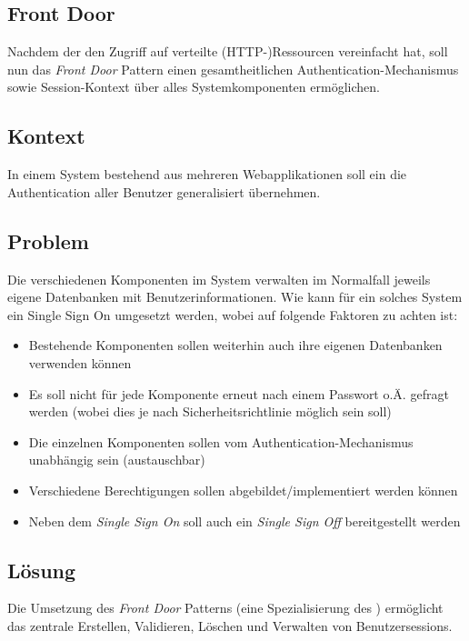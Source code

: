 \subsection{Front Door}

Nachdem der  den Zugriff auf verteilte (HTTP-)Ressourcen vereinfacht hat, soll nun das \emph{Front Door} Pattern einen gesamtheitlichen Authentication-Mechanismus sowie Session-Kontext über alles Systemkomponenten ermöglichen.

\subsection*{Kontext}
In einem System bestehend aus mehreren Webapplikationen soll ein  die Authentication aller Benutzer generalisiert übernehmen.

\subsection*{Problem}
Die verschiedenen Komponenten im System verwalten im Normalfall jeweils eigene Datenbanken mit Benutzerinformationen. Wie kann für ein solches System ein Single Sign On umgesetzt werden, wobei auf folgende Faktoren zu achten ist:

\begin{itemize}
	\item Bestehende Komponenten sollen weiterhin auch ihre eigenen Datenbanken verwenden können
	\item Es soll nicht für jede Komponente erneut nach einem Passwort o.Ä. gefragt werden (wobei dies je nach Sicherheitsrichtlinie möglich sein soll)
	\item Die einzelnen Komponenten sollen vom Authentication-Mechanismus unabhängig sein (austauschbar)
	\item Verschiedene Berechtigungen sollen abgebildet/implementiert werden können
	\item Neben dem \emph{Single Sign On} soll auch ein \emph{Single Sign Off} bereitgestellt werden
\end{itemize}


\subsection*{Lösung}
Die Umsetzung des \emph{Front Door} Patterns (eine Spezialisierung des ) ermöglicht das zentrale Erstellen, Validieren, Löschen und Verwalten von Benutzersessions.

